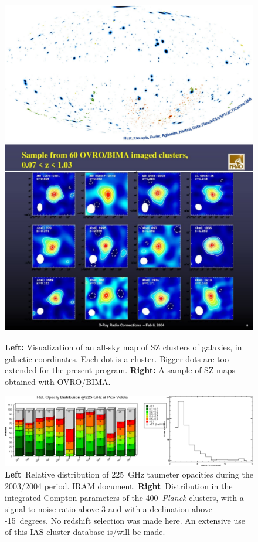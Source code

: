 \documentclass[10pt,a4paper,twoside,graphicx,color]{article}
\begin{document}
\begin{figure}
  \begin{center}
\includegraphics[width=0.45\columnwidth]{./Figures/Cat_all_colors_cr_DouspisEtAlCrop.pdf}
   \includegraphics[width=0.45\columnwidth]{./Figures/slide_8crop.pdf}
  \end{center}
\caption{{\bf Left:} Visualization of an all-sky map of SZ clusters of galaxies, in galactic coordinates. Each dot is a cluster. Bigger dots are too extended for the present program. {\bf Right: } A sample of SZ maps obtained with OVRO/BIMA. \cite{Reese2002}}

\label{Fig:AllSky}
\end{figure}
\begin{figure}
  \begin{center}
   \includegraphics[width=0.95\columnwidth]{./Figures/RelTau2004AndSZclustersCrop.pdf}
  \end{center}
  \caption{{\bf Left}~Relative distribution of 225~GHz taumeter
    opacities during the 2003/2004 period. IRAM document.  {\bf
      Right}~Distribution in the integrated Compton parameters of the
    400~{\sl Planck} clusters, with a signal-to-noise ratio above 3
    and with a declination above -15~degrees. No redshift selection
    was made here. An extensive use of
    \href{http://szcluster-db.ias.u-psud.fr/sitools/client-user/SZCLUSTER_DATABASE/project-index.html}{this
      IAS cluster database} is/will be made. }
\label{Fig:RelTau}
\end{figure}
\end{document}
